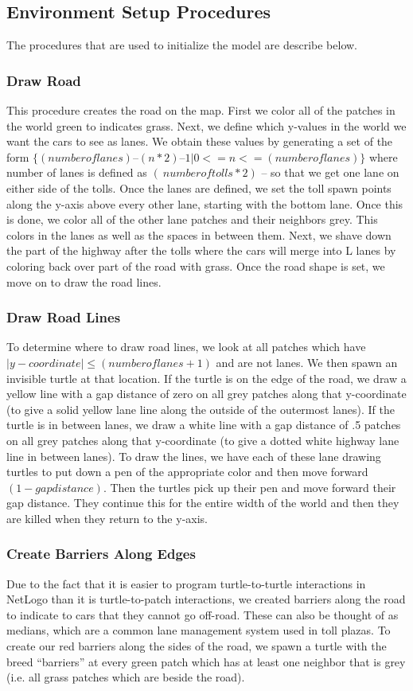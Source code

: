 \documentclass{article}
\begin{document}
\subsection{Environment Setup Procedures}
The procedures that are used to initialize the model are describe below.
\subsubsection{Draw Road}
This procedure creates the road on the map. First we color all of the patches in the world green to indicates grass. Next, we define which y-values in the world we want the cars to see as lanes. We obtain these values by generating a set of the form $\{(number of lanes) – (n * 2) – 1 | 0 <= n <= (number of lanes)\}$ where number of lanes is defined as $(\ {number of tolls} * 2)$ – so that we get one lane on either side of the tolls. Once the lanes are defined, we set the toll spawn points along the y-axis above every other lane, starting with the bottom lane. Once this is done, we color all of the other lane patches and their neighbors grey. This colors in the lanes as well as the spaces in between them. Next, we shave down the part of the highway after the tolls where the cars will merge into L lanes by coloring back over part of the road with grass. Once the road shape is set, we move on to draw the road lines.
\subsubsection{Draw Road Lines}
To determine where to draw road lines, we look at all patches which have $\lvert y-coordinate \rvert \leq (number of lanes + 1)$ and are not lanes. We then spawn an invisible turtle at that location. If the turtle is on the edge of the road, we draw a yellow line with a gap distance of zero on all grey patches along that y-coordinate (to give a solid yellow lane line along the outside of the outermost lanes). If the turtle is in between lanes, we draw a white line with a gap distance of .5 patches on all grey patches along that y-coordinate (to give a dotted white highway lane line in between lanes). To draw the lines, we have each of these lane drawing turtles to put down a pen of the appropriate color and then move forward $(1 - gap distance)$. Then the turtles pick up their pen and move forward their gap distance. They continue this for the entire width of the world and then they are killed when they return to the y-axis.
\subsubsection{Create Barriers Along Edges}
Due to the fact that it is easier to program turtle-to-turtle interactions in NetLogo than it is turtle-to-patch interactions, we created barriers along the road to indicate to cars that they cannot go off-road. These can also be thought of as medians, which are a common lane management system used in toll plazas. To create our red barriers along the sides of the road, we spawn a turtle with the breed “barriers” at every green patch which has at least one neighbor that is grey (i.e. all grass patches which are beside the road).
\end{document}
